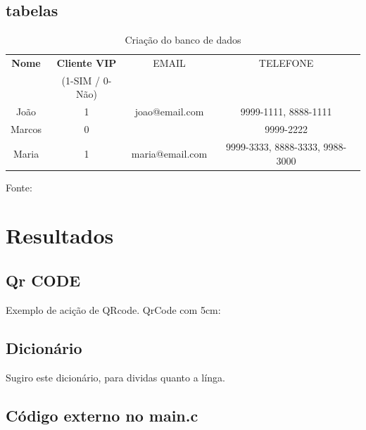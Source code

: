 \subsection{tabelas}

\begin{table}[H]
\center
  \caption{Criação do banco de dados}
  \begin{tabular}{ | c | c  | c | c |}
      \hline
      \textbf{Nome} & \textbf{Cliente VIP} & EMAIL & TELEFONE \\
          & (1-SIM / 0-Não)  &  &    \\
      \hline
          João & 1 & joao@email.com & 9999-1111, 8888-1111 \\
      \hline
          Marcos & 0 &  & 9999-2222 \\
      \hline
          Maria & 1 &maria@email.com & 9999-3333, 8888-3333, 9988-3000 \\
      \hline
  \end{tabular}
  \label{tab:banco}
  \flushleft %

  {\fontsize{10pt}{\baselineskip}\selectfont
    Fonte: }
\end{table}


\section{Resultados}
\lipsum[2-2]



\subsection{Qr CODE}
\par Exemplo de acição de QRcode.
\qquad
QrCode com 5cm:
\quad
{}

\subsection{Dicionário}

\par Sugiro este dicionário, para dividas quanto a línga.
\quad
{}

\subsection{Código externo no main.c}




